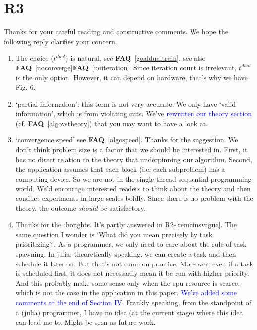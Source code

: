 \documentclass[11pt]{article}
\newcommand{\faq}[1]{\textbf{FAQ}~\ref{#1}}
\newcommand{\blue}[1]{\textcolor{blue}{#1}}
\begin{document}
\section{R3} \label{r3ans}
Thanks for your careful reading and constructive comments. We hope the following reply clarifies your concern.
\begin{enumerate}
    \item The choice ($t^{dual}$) is natural, see \faq{goaldualtrain}. see also \faq{noconverge}\faq{noiteration}.
    Since iteration count is irrelevant, $t^{dual}$ is the only option. However, it can depend on hardware, that's
    why we have Fig. 6.
    \item `partial information': this term is not very accurate. We only have `valid information', which
    is from violating cuts. We've \blue{rewritten our theory section} (cf. \faq{algovstheory}) that you may want to have a look at.
    \item `convergence speed' see \faq{algospeed}. Thanks for the suggestion. We don't think
    problem size is a factor that we should be interested in. First, it has no direct relation to the
    theory that underpinning our algorithm. Second, the application assumes that each block (i.e. each subproblem)
    has a computing device. So we are not in the single-thread sequential programming world.
    We'd encourage interested readers to think about the theory and then conduct experiments in large scales boldly.
    Since there is no problem with the theory, the outcome \textit{should} be satisfactory.
    \item \label{r3_future} Thanks for the thoughts. It's partly answered in R2-\ref{remainsvague}.
    The same question I wonder is `What did you mean precisely by task prioritizing?'.
    As a programmer, we only need to care about the rule of task spawning.
    In julia, theoretically speaking, we can create a task and then schedule it later on.
    But that's not common practice. Moreover, even if a task is scheduled first, it does not necessarily mean it be run with higher priority.
    And this probably make some sense only when the cpu resource is scarce, which is not the case in the application in this paper.
    \blue{We've added some comments at the end of Section IV.}
    Frankly speaking, from the standpoint of a (julia) programmer, I have no idea (at the current stage) where this idea can lead me to. Might be seen as future work.
\end{enumerate}
\end{document}

